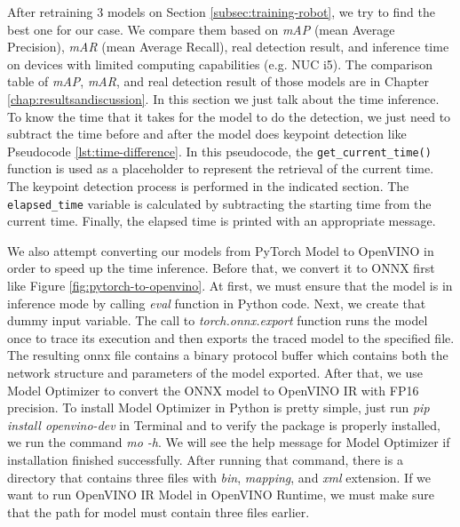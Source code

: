 After retraining 3 models on Section \ref{subsec:training-robot}, we try to find the best one for our case. We compare them based on \emph{mAP} (mean Average Precision), \emph{mAR} (mean Average Recall),
real detection result, and inference time on devices with limited computing capabilities (e.g. NUC i5).
The comparison table of \emph{mAP}, \emph{mAR}, and real detection result of those models are in Chapter \ref{chap:resultsandiscussion}. In this section we just talk about the time inference.
To know the time that it takes for the model to do the detection, we just need to subtract the time before and after the model does keypoint detection like Pseudocode \ref{lst:time-difference}.
In this pseudocode, the \verb|get_current_time()| function is used as a placeholder to represent the retrieval of the current time. The keypoint detection process is performed in the indicated section.
The \verb|elapsed_time| variable is calculated by subtracting the starting time from the current time. Finally, the elapsed time is printed with an appropriate message.



We also attempt converting our models from PyTorch Model to OpenVINO in order to speed up the time inference. Before that, we convert it to ONNX first like Figure \ref{fig:pytorch-to-openvino}.
At first, we must ensure that the model is in inference mode by calling \emph{eval} function in Python code.
Next, we create that dummy input variable. The call to \emph{torch.onnx.export} function runs the model once to trace its execution and then exports the traced model to the specified file.
The resulting onnx file contains a binary protocol buffer which contains both the network structure and parameters of the model exported.
After that, we use Model Optimizer to convert the ONNX model to OpenVINO IR with FP16 precision. To install Model Optimizer in Python is pretty simple, just run
\emph{pip install openvino-dev} in Terminal and to verify the package is properly installed, we run the command \emph{mo -h}. We will see the help message for Model Optimizer if installation finished successfully.
After running that command, there is a directory that contains three files with \emph{bin}, \emph{mapping}, and \emph{xml} extension.
If we want to run OpenVINO IR Model in OpenVINO Runtime, we must make sure that the path for model must contain three files earlier.


